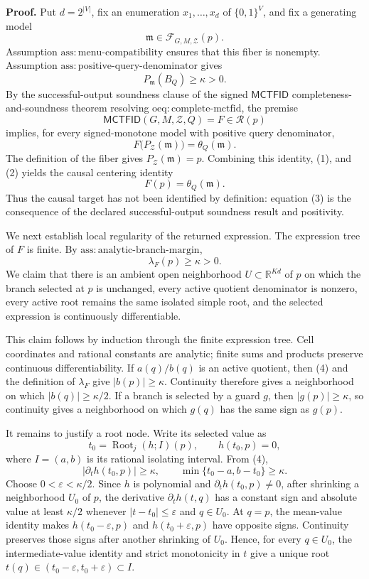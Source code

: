 \textbf{Proof.}
Put \(d=2^{|V|}\), fix an enumeration \(x_1,\ldots,x_d\) of \(\{0,1\}^{V}\), and fix a generating model
\[
 \mathfrak m\in\mathcal F_{G,M,\mathcal Z}(p).
\]
Assumption \(\mathrm{ass:menu\text{-}compatibility}\) ensures that this fiber is nonempty. Assumption \(\mathrm{ass:positive\text{-}query\text{-}denominator}\) gives
\[
 P_{\mathfrak m}(B_Q)\geq\kappa>0. \tag{1}
\]
By the successful-output soundness clause of the signed \(\mathsf{MCTFID}\) completeness-and-soundness theorem resolving \(\mathrm{oeq:complete\text{-}mctfid}\), the premise
\[
 \mathsf{MCTFID}(G,M,\mathcal Z,Q)=F\in\mathcal R(p)
\]
implies, for every signed-monotone model with positive query denominator,
\[
 F\bigl(P_{\mathcal Z}(\mathfrak m)\bigr)=\theta_Q(\mathfrak m). \tag{2}
\]
The definition of the fiber gives \(P_{\mathcal Z}(\mathfrak m)=p\). Combining this identity, (1), and (2) yields the causal centering identity
\[
 F(p)=\theta_Q(\mathfrak m). \tag{3}
\]
Thus the causal target has not been identified by definition: equation (3) is the consequence of the declared successful-output soundness result and positivity.

We next establish local regularity of the returned expression. The expression tree of \(F\) is finite. By \(\mathrm{ass:analytic\text{-}branch\text{-}margin}\),
\[
 \lambda_F(p)\geq\kappa>0. \tag{4}
\]
We claim that there is an ambient open neighborhood \(U\subset\mathbb R^{Kd}\) of \(p\) on which the branch selected at \(p\) is unchanged, every active quotient denominator is nonzero, every active root remains the same isolated simple root, and the selected expression is continuously differentiable.

This claim follows by induction through the finite expression tree. Cell coordinates and rational constants are analytic; finite sums and products preserve continuous differentiability. If \(a(q)/b(q)\) is an active quotient, then (4) and the definition of \(\lambda_F\) give \(|b(p)|\geq\kappa\). Continuity therefore gives a neighborhood on which \(|b(q)|\geq\kappa/2\). If a branch is selected by a guard \(g\), then \(|g(p)|\geq\kappa\), so continuity gives a neighborhood on which \(g(q)\) has the same sign as \(g(p)\).

It remains to justify a root node. Write its selected value as
\[
 t_0=\operatorname{Root}_j(h;I)(p),\qquad h(t_0,p)=0,
\]
where \(I=(a,b)\) is its rational isolating interval. From (4),
\[
 |\partial_t h(t_0,p)|\geq\kappa,
 \qquad
 \min\{t_0-a,b-t_0\}\geq\kappa. \tag{5}
\]
Choose \(0<\varepsilon<\kappa/2\). Since \(h\) is polynomial and \(\partial_t h(t_0,p)\ne0\), after shrinking a neighborhood \(U_0\) of \(p\), the derivative \(\partial_t h(t,q)\) has a constant sign and absolute value at least \(\kappa/2\) whenever \(|t-t_0|\leq\varepsilon\) and \(q\in U_0\). At \(q=p\), the mean-value identity makes \(h(t_0-\varepsilon,p)\) and \(h(t_0+\varepsilon,p)\) have opposite signs. Continuity preserves those signs after another shrinking of \(U_0\). Hence, for every \(q\in U_0\), the intermediate-value identity and strict monotonicity in \(t\) give a unique root \(t(q)\in(t_0-\varepsilon,t_0+\varepsilon)\subset I\).

